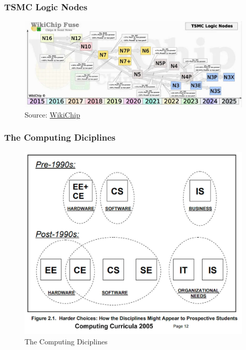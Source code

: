 \documentclass[aspectratio=169, xcolor=table, notheorems, hyperref={pdfpagelabels=false}]{beamer}
\begin{document}
\begin{frame}[fragile]
\frametitle{TSMC Logic Nodes}
\begin{figure}
\includegraphics[width=0.95\linewidth]{tsmc_logic_node}
\caption{Source: 
  \href{https://fuse.wikichip.org/wp-content/uploads/2022/09/wikichip_tsmc_logic_node_q2_2022-2.png}{WikiChip}}
\end{figure}
\end{frame}

\begin{frame}[fragile]
\frametitle{The Computing Diciplines}
\begin{figure}
\includegraphics[width=0.59\linewidth]{pic-cc2005}
\caption{The Computing Diciplines}
\end{figure}
\end{frame}
\end{document}
